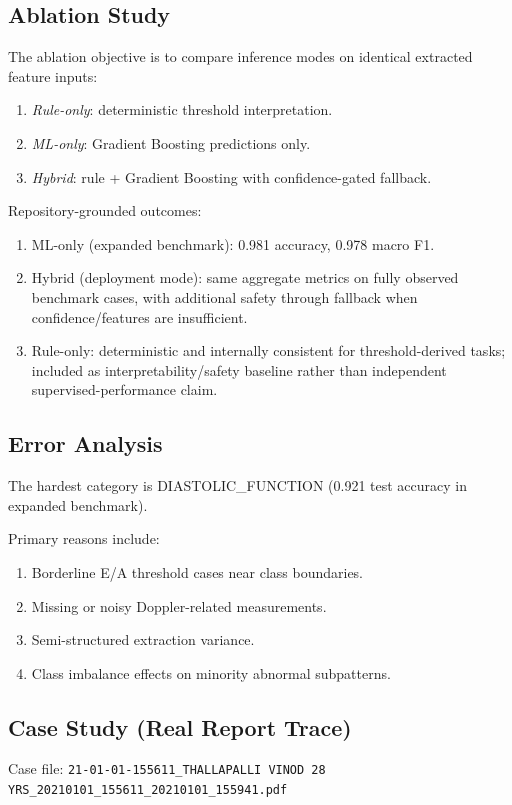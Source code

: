 \documentclass[10pt,twocolumn,letterpaper]{IEEEtran}
\begin{document}
\subsection{Ablation Study}
The ablation objective is to compare inference modes on identical extracted feature inputs:
\begin{enumerate}
\item \textit{Rule-only}: deterministic threshold interpretation.
\item \textit{ML-only}: Gradient Boosting predictions only.
\item \textit{Hybrid}: rule + Gradient Boosting with confidence-gated fallback.
\end{enumerate}

Repository-grounded outcomes:
\begin{enumerate}
\item ML-only (expanded benchmark): 0.981 accuracy, 0.978 macro F1.
\item Hybrid (deployment mode): same aggregate metrics on fully observed benchmark cases, with additional safety through fallback when confidence/features are insufficient.
\item Rule-only: deterministic and internally consistent for threshold-derived tasks; included as interpretability/safety baseline rather than independent supervised-performance claim.
\end{enumerate}

\subsection{Error Analysis}
The hardest category is DIASTOLIC\_FUNCTION (0.921 test accuracy in expanded benchmark).

Primary reasons include:
\begin{enumerate}
\item Borderline E/A threshold cases near class boundaries.
\item Missing or noisy Doppler-related measurements.
\item Semi-structured extraction variance.
\item Class imbalance effects on minority abnormal subpatterns.
\end{enumerate}

\subsection{Case Study (Real Report Trace)}
Case file: \texttt{21-01-01-155611\_THALLAPALLI VINOD 28 YRS\_20210101\_155611\_20210101\_155941.pdf}
\end{document}
